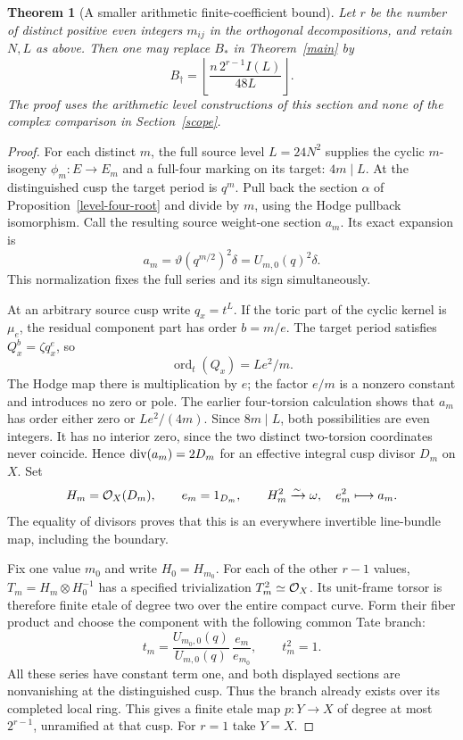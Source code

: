 \documentclass[11pt]{article}
\newtheorem{theorem}{Theorem}[section]
\theoremstyle{remark}\newtheorem{remark}[theorem]{Remark}
\DeclareMathOperator{\ord}{ord}\DeclareMathOperator{\diag}{diag}
\begin{document}
\begin{theorem}[A smaller arithmetic finite-coefficient bound]\label{sharper-bound}
Let $r$ be the number of distinct positive even integers $m_{ij}$ in the
orthogonal decompositions, and retain $N,L$ as above. Then one may replace
$B_*$ in Theorem~\ref{main} by
\[
 B_\dagger=
 \left\lfloor\frac{n\,2^{r-1}I(L)}{48L}\right\rfloor.
\]
The proof uses the arithmetic level constructions of this section and
none of the complex comparison in Section~\ref{scope}.
\end{theorem}
\begin{proof}
For each distinct $m$, the full source level $L=24N^2$ supplies the cyclic
$m$-isogeny $\phi_m:E\to E_m$ and a full-four marking on its target:
$4m\mid L$. At the distinguished cusp the target period is $q^m$.
Pull back the section $\alpha$ of Proposition~\ref{level-four-root}
and divide by $m$, using the Hodge pullback isomorphism. Call the
resulting source weight-one section $a_m$. Its exact expansion is
\[
 a_m=\vartheta(q^{m/2})^2\delta=U_{m,0}(q)^2\delta.
\]
This normalization fixes the full series and its sign simultaneously.

At an arbitrary source cusp write $q_x=t^L$. If the toric part of the
cyclic kernel is $\mu_e$, the residual component part has order
$b=m/e$. The target period satisfies
$Q_x^b=\zeta q_x^e$, so
\[
 \ord_t(Q_x)=Le^2/m.
\]
The Hodge map there is multiplication by $e$; the factor $e/m$ is a
nonzero constant and introduces no zero or pole. The earlier
four-torsion calculation shows that $a_m$ has order either zero or
$Le^2/(4m)$. Since $8m\mid L$, both possibilities are even integers.
It has no interior zero, since the two distinct two-torsion coordinates
never coincide. Hence $\operatorname{div}(a_m)=2D_m$ for an effective integral
cusp divisor $D_m$ on $X$. Set
\[
 H_m=\mathcal O_X(D_m),\qquad e_m=1_{D_m},\qquad
 H_m^2\xrightarrow{\sim}\omega,\quad e_m^2\longmapsto a_m.
\]
The equality of divisors proves that this is an everywhere invertible
line-bundle map, including the boundary.

Fix one value $m_0$ and write $H_0=H_{m_0}$. For each of the other
$r-1$ values, $T_m=H_m\otimes H_0^{-1}$ has a specified trivialization
$T_m^2\simeq\mathcal O_X$. Its unit-frame torsor is therefore finite etale
of degree two over the entire compact curve. Form their fiber product
and choose the component with the following common Tate branch:
\[
 t_m=\frac{U_{m_0,0}(q)}{U_{m,0}(q)}\,
             \frac{e_m}{e_{m_0}},\qquad t_m^2=1.
\]
All these series have constant term one, and both displayed sections
are nonvanishing at the distinguished cusp. Thus the branch already
exists over its completed local ring. This gives a finite etale map
$p:Y\to X$ of degree at most $2^{r-1}$, unramified at that cusp.
For $r=1$ take $Y=X$.


\end{proof}
\end{document}

